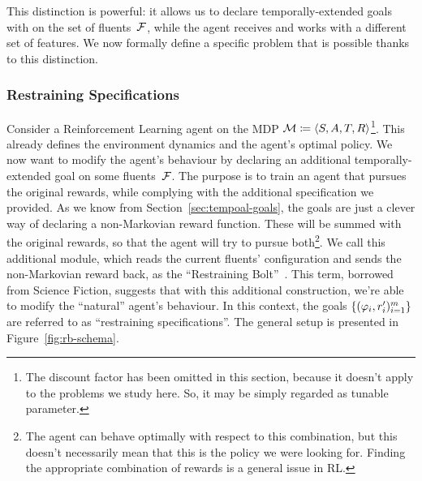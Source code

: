 This distinction is powerful: it allows us to declare temporally-extended
goals with \ldl{} on the set of fluents~$\mathcal{F}$, while the agent receives
and works with a different set of features. We now formally define a specific
problem that is possible thanks to this distinction.


\subsubsection{Restraining Specifications}

Consider a Reinforcement Learning agent on the MDP $\mathcal{M} \coloneqq \langle
S, A, T, R \rangle$\footnote{
	The discount factor has been omitted in this section, because it doesn't
	apply to the problems we study here. So, it may be simply regarded as
	tunable parameter.
}.
This already defines the environment dynamics and the agent's optimal policy.
We now want to modify the agent's behaviour by declaring an additional
temporally-extended goal on some fluents~$\mathcal{F}$.  The purpose is to train
an agent that pursues the original rewards, while complying with the
additional specification we provided.  As we know from
Section~\ref{sec:tempoal-goals}, the \ldl{} goals are just a clever way of
declaring a non-Markovian reward function. These will be summed with the
original rewards, so that the agent will try to pursue both\footnote{
	The agent can behave optimally with respect to this combination, but this
	doesn't necessarily mean that this is the policy we were looking for.
	Finding the appropriate combination of rewards is a general issue in RL.
}.
We call this additional module, which reads the current fluents' configuration
and sends the non-Markovian reward back, as the ``Restraining
Bolt''~\cite{bib:bolt}. This term, borrowed from Science Fiction, suggests
that with this additional construction, we're able to modify the ``natural''
agent's behaviour. In this context, the \ldl{} goals $\{(\varphi_i,
r_i')_{i=1}^m\}$ are referred to as ``restraining specifications''. The general
setup is presented in Figure~\ref{fig:rb-schema}.

